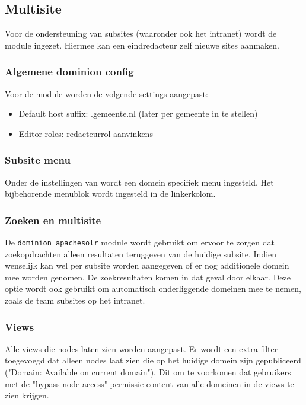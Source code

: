 \subsection{Multisite}\label{multisite}

Voor de ondersteuning van subsites (waaronder ook het intranet) wordt de  module ingezet. Hiermee kan een eindredacteur zelf nieuwe sites aanmaken.

\subsubsection{Algemene dominion config}
Voor de  module worden de volgende settings aangepast:
\begin{itemize}
\item Default host suffix: .gemeente.nl (later per gemeente in te stellen)
\item Editor roles: redacteurrol aanvinkens
\end{itemize}

\subsubsection{Subsite menu}
Onder de instellingen van  wordt een domein specifiek menu ingesteld. Het bijbehorende menublok wordt ingesteld in de linkerkolom.

\subsubsection{Zoeken en multisite}
De \texttt{dominion\_apachesolr} module wordt gebruikt om ervoor te zorgen dat zoekopdrachten alleen resultaten teruggeven van de huidige subsite. Indien wenselijk kan wel per subsite worden aangegeven of er nog additionele domein mee worden genomen. De zoekresultaten komen in dat geval door elkaar. Deze optie wordt ook gebruikt om automatisch onderliggende domeinen mee te nemen, zoals de team subsites op het intranet.

\subsubsection{Views}
Alle views die nodes laten zien worden aangepast. Er wordt een extra filter toegevoegd dat alleen nodes laat zien die op het huidige domein zijn gepubliceerd ("Domain: Available on current domain"). Dit om te voorkomen dat gebruikers met de "bypass node access" permissie content van alle domeinen in de views te zien krijgen.

